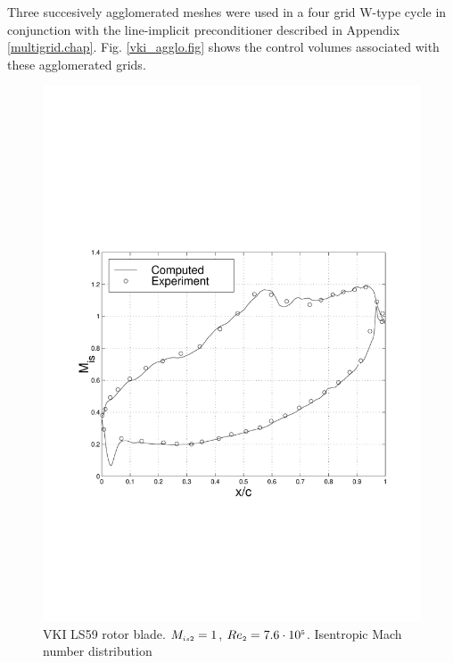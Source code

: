 %
 Three succesively agglomerated meshes were used in a four grid W-type cycle
 in conjunction with the line-implicit preconditioner described
 in Appendix \ref{multigrid.chap}.
 Fig. \ref{vki_agglo.fig} shows the control volumes associated with
 these agglomerated grids.
%
\begin{figure}
  \centerline{\includegraphics[width=130mm,clip=t]{CHAP_NONLIN/FIGURE/vki_blade.pdf}}
 \vspace{-5mm}
 \caption{VKI LS59 rotor blade. $M_{\mbox{\tiny $is2$}} = 1$, $Re_{\mbox{\tiny $2$}} = 7.6\cdot10^{\mbox{\tiny $5$}}$.
          Isentropic Mach number distribution}
 \label{vki_mach_blade.fig}
\end{figure}
%
%
